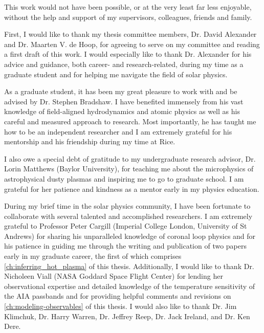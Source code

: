 
\begin{acknowledgements}      

This work would not have been possible, or at the very least far less enjoyable, without the help and support of my supervisors, colleagues, friends and family. 

First, I would like to thank my thesis committee members, Dr. David Alexander and Dr. Maarten V. de Hoop, for agreeing to serve on my committee and reading a first draft of this work. I would especially like to thank Dr. Alexander for his advice and guidance, both career- and research-related, during my time as a graduate student and for helping me navigate the field of solar physics.

As a graduate student, it has been my great pleasure to work with and be advised by Dr. Stephen Bradshaw. I have benefited immensely from his vast knowledge of field-aligned hydrodynamics and atomic physics as well as his careful and measured approach to research. Most importantly, he has taught me how to be an independent researcher and I am extremely grateful for his mentorship and his friendship during my time at Rice.

I also owe a special debt of gratitude to my undergraduate research advisor, Dr. Lorin Matthews (Baylor University), for teaching me about the microphysics of astrophysical dusty plasmas and inspiring me to go to graduate school. I am grateful for her patience and kindness as a mentor early in my physics education.

During my brief time in the solar physics community, I have been fortunate to collaborate with several talented and accomplished researchers. I am extremely grateful to Professor Peter Cargill (Imperial College London, University of St Andrews) for sharing his unparalleled knowledge of coronal loop physics and for his patience in guiding me through the writing and publication of two papers early in my graduate career, the first of which comprises \autoref{ch:inferring_hot_plasma} of this thesis. Additionally, I would like to thank Dr. Nicholeen Viall (NASA Goddard Space Flight Center) for lending her observational expertise and detailed knowledge of the temperature sensitivity of the AIA passbands and for providing helpful comments and revisions on \autoref{ch:modeling-observables} of this thesis. I would also like to thank Dr. Jim Klimchuk, Dr. Harry Warren, Dr. Jeffrey Reep, Dr. Jack Ireland, and Dr. Ken Dere.


\end{acknowledgements}

